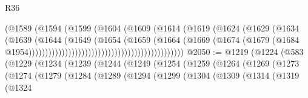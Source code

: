 \begin{lexlean}{R36}
\begin{coremodule}
                                                          (@1589
                                                            (@1594
                                                              (@1599
                                                                (@1604
                                                                  (@1609
                                                                    (@1614
                                                                      (@1619
                                                                        (@1624
                                                                          (@1629
                                                                            (@1634
                                                                              (@1639
                                                                                (@1644
                                                                                  (@1649
                                                                                    (@1654
                                                                                      (@1659
                                                                                        (@1664
                                                                                          (@1669
                                                                                            (@1674
                                                                                              (@1679
                                                                                                (@1684
                                                                                                  @1954)))))))))))))))))))))))))))))))))))))))))))))))
@2050 := @1219
    (@1224
      (@583
        (@1229
          (@1234
            (@1239
              (@1244
                (@1249
                  (@1254
                    (@1259
                      (@1264
                        (@1269
                          (@1273
                            (@1274
                              (@1279
                                (@1284
                                  (@1289
                                    (@1294
                                      (@1299
                                        (@1304
                                          (@1309
                                            (@1314
                                              (@1319
                                                (@1324

\end{coremodule}
\end{lexlean}
